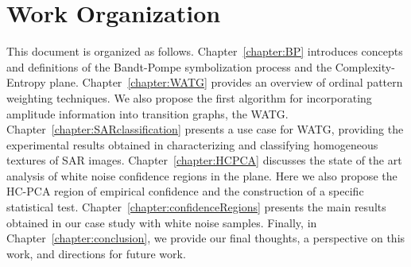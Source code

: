\section{Work Organization}


This document is organized as follows.
Chapter~\ref{chapter:BP} introduces concepts and definitions of the Bandt-Pompe symbolization process and the Complexity-Entropy plane.
Chapter~\ref{chapter:WATG} provides an overview of ordinal pattern weighting techniques. 
We also propose the first algorithm for incorporating amplitude information into transition graphs, the WATG.
Chapter~\ref{chapter:SARclassification} presents a use case for WATG, providing the experimental results obtained in characterizing and classifying homogeneous textures of SAR images.
Chapter~\ref{chapter:HCPCA} discusses the state of the art analysis of white noise confidence regions in the plane. 
Here we also propose the HC-PCA region of empirical confidence and the construction of a specific statistical test.
Chapter~\ref{chapter:confidenceRegions} presents the main results obtained in our case study with white noise samples.
Finally, in Chapter~\ref{chapter:conclusion}, we provide our final thoughts, a perspective on this work, and directions for future work.